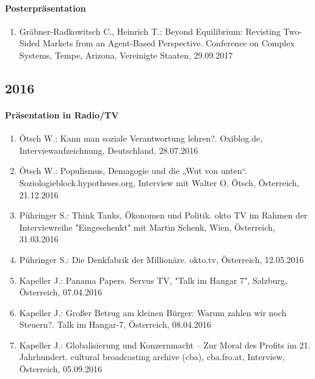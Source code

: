 \paragraph{Posterpräsentation}
\begin{enumerate}
	\item Gräbner-Radkowitsch C., Heinrich T.: Beyond Equilibrium: Revisting Two-Sided Markets from an Agent-Based Perspective. Conference on Complex Systems, Tempe, Arizona, Vereinigte Staaten, 29.09.2017
\end{enumerate}
\subsection*{2016}

    \paragraph{Präsentation in Radio/TV}
\begin{enumerate}
	\item Ötsch W.: Kann man soziale Verantwortung lehren?. Oxiblog.de, Interviewaufzeichnung, Deutschland, 28.07.2016
	\item Ötsch W.: Populismus, Demagogie und die „Wut von unten“. Soziologieblock.hypotheses.org, Interview mit Walter O. Ötsch, Österreich, 21.12.2016
	\item Pühringer S.: Think Tanks, Ökonomen und Politik. okto TV im Rahmen der Interviewreihe "Eingeschenkt" mit Martin Schenk, Wien, Österreich, 31.03.2016
	\item Pühringer S.: Die Denkfabrik der Millionäre. okto.tv, Österreich, 12.05.2016
	\item Kapeller J.: Panama Papers. Servus TV, "Talk im Hangar 7", Salzburg, Österreich, 07.04.2016
	\item Kapeller J.: Großer Betrug am kleinen Bürger: Warum zahlen wir noch Steuern?. Talk im Hangar-7, Österreich, 08.04.2016
	\item Kapeller J.: Globalisierung und Konzernmacht – Zur Moral des Profits im 21. Jahrhundert. cultural broadcasting archive (cba), cba.fro.at, Interview, Österreich, 05.09.2016
\end{enumerate}
